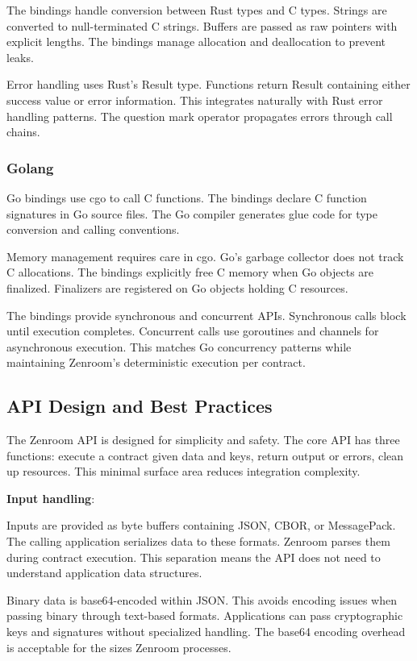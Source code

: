 The bindings handle conversion between Rust types and C types. Strings
are converted to null-terminated C strings. Buffers are passed as raw
pointers with explicit lengths. The bindings manage allocation and
deallocation to prevent leaks.

Error handling uses Rust's Result type. Functions return Result
containing either success value or error information. This integrates
naturally with Rust error handling patterns. The question mark
operator propagates errors through call chains.

\subsubsection{Golang}

Go bindings use cgo to call C functions. The bindings declare C
function signatures in Go source files. The Go compiler generates glue
code for type conversion and calling conventions.

Memory management requires care in cgo. Go's garbage collector does
not track C allocations. The bindings explicitly free C memory when Go
objects are finalized. Finalizers are registered on Go objects holding
C resources.

The bindings provide synchronous and concurrent APIs. Synchronous
calls block until execution completes. Concurrent calls use goroutines
and channels for asynchronous execution. This matches Go concurrency
patterns while maintaining Zenroom's deterministic execution per
contract.

\subsection{API Design and Best Practices}

The Zenroom API is designed for simplicity and safety. The core API
has three functions: execute a contract given data and keys, return
output or errors, clean up resources. This minimal surface area
reduces integration complexity.

\textbf{Input handling}:

Inputs are provided as byte buffers containing JSON, CBOR, or
MessagePack. The calling application serializes data to these
formats. Zenroom parses them during contract execution. This
separation means the API does not need to understand application data
structures.

Binary data is base64-encoded within JSON. This avoids encoding issues
when passing binary through text-based formats. Applications can pass
cryptographic keys and signatures without specialized handling. The
base64 encoding overhead is acceptable for the sizes Zenroom
processes.

